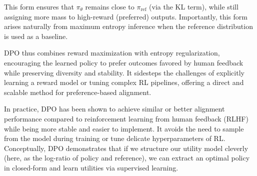 \documentclass[
  letterpaper,
  numbers=noenddot,
  DIV=11]{scrreprt}
\theoremstyle{plain}
\theoremstyle{definition}
\theoremstyle{remark}
\begin{document}
This form ensures that \(\pi_\theta\) remains close to
\(\pi_{\text{ref}}\) (via the KL term), while still assigning more mass
to high-reward (preferred) outputs. Importantly, this form arises
naturally from maximum entropy inference when the reference distribution
is used as a baseline.

DPO thus combines reward maximization with entropy regularization,
encouraging the learned policy to prefer outcomes favored by human
feedback while preserving diversity and stability. It sidesteps the
challenges of explicitly learning a reward model or tuning complex RL
pipelines, offering a direct and scalable method for preference-based
alignment.

In practice, DPO has been shown to achieve similar or better alignment
performance compared to reinforcement learning from human feedback
(RLHF) while being more stable and easier to implement. It avoids the
need to sample from the model during training or tune delicate
hyperparameters of RL. Conceptually, DPO demonstrates that if we
structure our utility model cleverly (here, as the log-ratio of policy
and reference), we can extract an optimal policy in closed-form and
learn utilities via supervised learning.
\end{document}
